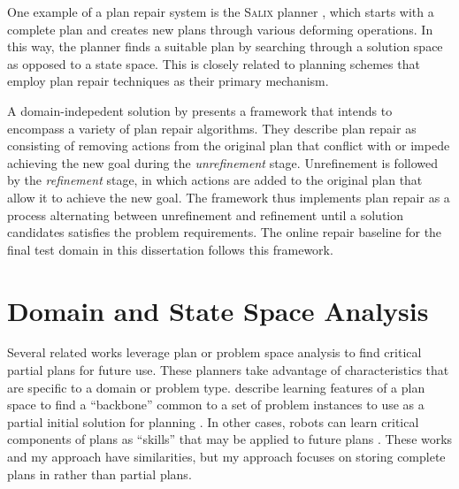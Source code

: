 One example of a plan repair system is the \textsc{Salix} planner \citep{logan97routeplanning}, which starts with a complete plan and creates new plans through various deforming operations.  In this way, the planner finds a suitable plan by searching through a solution space as opposed to a state space.  This is closely related to planning schemes that employ plan repair techniques as their primary mechanism.




A domain-indepedent solution by \cite{krogt05planrepair} presents a framework that intends to encompass a variety of plan repair algorithms.  They describe plan repair as consisting of removing actions from the original plan that conflict with or impede achieving the new goal during the \textit{unrefinement} stage.  Unrefinement is followed by the \textit{refinement} stage, in which actions are added to the original plan that allow it to achieve the new goal. The framework thus implements plan repair as a process alternating between  unrefinement and refinement until a  solution candidates satisfies the problem requirements.  The online repair baseline for the final test domain in this dissertation follows this framework.



\section{Domain and State Space Analysis}
\label{sec:state-space-analysis}

Several related works leverage plan or problem space analysis to find critical partial plans for future use. These planners take advantage of characteristics that are specific to a domain or problem type.  \citeauthor{bulka08useful}  describe learning features of a plan space to find a ``backbone'' common to a set of problem instances to use as a partial initial solution for planning \citep{bulka06analyzing,bulka08useful}.  In other cases, robots can learn critical components of plans as ``skills'' that may be applied to future plans \citep{konidaris08autonomous,konidaris08sensorimotor}.  These works and my approach have similarities, but my approach focuses on storing complete plans in rather than partial plans.

